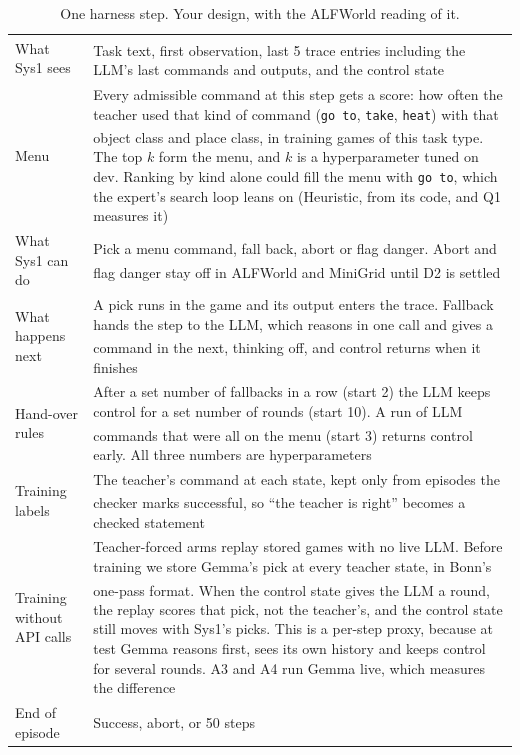 \documentclass[10pt]{article}
\newcommand{\my}{\textsuperscript{\textcolor{blue!70!black}{\dag}}}
\begin{document}
\begin{table}[H]
\footnotesize
\caption{One harness step. Your design, with the ALFWorld reading of it.}
\label{t:harness}
\begin{tabularx}{\linewidth}{@{}P{3cm} L@{}}
\toprule
What Sys1 sees & Task text, first observation, last 5\my{} trace entries including the LLM's last commands and outputs, and the control state \\
Menu & Every admissible command at this step gets a score: how often the teacher used that kind of command (\texttt{go to}, \texttt{take}, \texttt{heat}) with that object class and place class, in training games of this task type\my. The top $k$ form the menu, and $k$ is a hyperparameter tuned on dev. Ranking by kind alone could fill the menu with \texttt{go to}, which the expert's search loop leans on (Heuristic, from its code, and Q1 measures it) \\
What Sys1 can do & Pick a menu command, fall back, abort or flag danger. Abort and flag danger stay off in ALFWorld and MiniGrid until D2 is settled\my \\
What happens next & A pick runs in the game and its output enters the trace. Fallback hands the step to the LLM, which reasons in one call and gives a command in the next, thinking off\my, and control returns when it finishes \\
Hand-over rules & After a set number of fallbacks in a row (start 2) the LLM keeps control for a set number of rounds (start 10). A run of LLM commands that were all on the menu (start 3\my) returns control early. All three numbers are hyperparameters \\
Training labels & The teacher's command at each state, kept only from episodes the checker marks successful\my, so ``the teacher is right'' becomes a checked statement \\
Training without API calls & Teacher-forced arms replay stored games with no live LLM. Before training we store Gemma's pick at every teacher state, in Bonn's one-pass format\my. When the control state gives the LLM a round, the replay scores that pick, not the teacher's, and the control state still moves with Sys1's picks. This is a per-step proxy, because at test Gemma reasons first, sees its own history and keeps control for several rounds. A3 and A4 run Gemma live, which measures the difference \\
End of episode & Success, abort, or 50 steps \\
\bottomrule
\end{tabularx}
\end{table}
\end{document}
